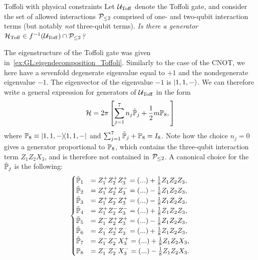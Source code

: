 \begin{examplebox}[label={ex:GL:toffoli_physical_constraints}]{Toffoli with physical constraints}
Let ${\mathcal{U}}_{\operatorname{Toff}}$ denote the Toffoli gate, and consider the set of allowed interactions ${\mathcal{P}}_{\le2}$ comprised of one- and two-qubit interaction terms (but notably \textit{not} three-qubit terms).
\emph{\textit{Is there a generator ${\mathcal{H}}_{\operatorname{Toff}}\in f^{-1}({\mathcal{U}}_{\operatorname{Toff}})\cap{\mathcal{P}}_{\le2}$?}}

The eigenstructure of the Toffoli gate was given in~\cref{ex:GL:eigendecomposition_Toffoli}. Similarly to the case of the CNOT, we here have a sevenfold degenerate eigenvalue equal to $+1$ and the nondegenerate eigenvalue $-1$.
The eigenvector of the eigenvalue $-1$ is $\ket{1,1,-}$. We can therefore write a general expression for generators of ${\mathcal{U}}_{\operatorname{Toff}}$ in the form
\begin{equation}
    {\mathcal{H}}=2\pi \left[
        \sum_{j=1}^7 n_j \tilde{\mathbb{P}}_j
        +\frac12 m\mathbb{P}_8,
    \right]
\end{equation}
where $\mathbb{P}_8\equiv\ketbra{1,1,-}$ and $\sum_{j=1}^7\tilde{\mathbb{P}}_j+\mathbb{P}_8=I_8$.
Note how the choice $n_j=0$ gives a generator proportional to $\mathbb{P}_8$, which contains the three-qubit interaction term $Z_1 Z_2 X_3$, and is therefore not contained in ${\mathcal{P}}_{\le2}$.
A canonical choice for the $\tilde{\mathbb{P}}_j$ is the following:
\begin{equation}
\begin{cases}
    \tilde{\mathbb{P}}_1 &= Z_1^+ Z_2^+ Z_3^+ = (...) + \frac18 Z_1 Z_2 Z_3, \\
    \tilde{\mathbb{P}}_2 &= Z_1^+ Z_2^+ Z_3^- = (...) - \frac{1}{8} Z_1 Z_2 Z_3, \\
    \tilde{\mathbb{P}}_3 &= Z_1^+ Z_2^- Z_3^+ = (...) - \frac18 Z_1 Z_2 Z_3, \\
    \tilde{\mathbb{P}}_4 &= Z_1^+ Z_2^- Z_3^- = (...) + \frac18 Z_1 Z_2 Z_3, \\
    \tilde{\mathbb{P}}_5 &= Z_1^- Z_2^+ Z_3^+ = (...) - \frac18 Z_1 Z_2 Z_3, \\
    \tilde{\mathbb{P}}_6 &= Z_1^- Z_2^+ Z_3^- = (...) + \frac18 Z_1 Z_2 Z_3, \\
    \tilde{\mathbb{P}}_7 &= Z_1^- Z_2^- X_3^+ = (...) + \frac18 Z_1 Z_2 X_3, \\
    \mathbb{P}_8 &= Z_1^- Z_2^- X_3^- = (...) - \frac18 Z_1 Z_2 X_3.
\end{cases}
\end{equation}

\end{examplebox}
